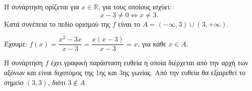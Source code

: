 
\begin{alist}
\item Η συνάρτηση ορίζεται για $x \in \mathbb{R}$, για τους οποίους ισχύει:
\[x - 3 \ne 0 \Leftrightarrow x \ne 3.\]
Κατά συνέπεια το πεδίο ορισμού της $f$ είναι το $A = (-\infty, 3) \cup (3, +\infty)$.

\item Έχουμε: $f(x) = \dfrac{x^2 - 3x}{x - 3} = \dfrac{x(x - 3)}{x - 3} = x$, για κάθε $x \in A$.

\item Η συνάρτηση $f$ έχει γραφική παράσταση ευθεία η οποία διέρχεται από την αρχή των
αξόνων και είναι διχοτόμος της 1ης και 3ης γωνίας.
Από την ευθεία θα εξαιρεθεί το σημείο $(3, 3)$, διότι $3 \notin A$.
\end{alist}

